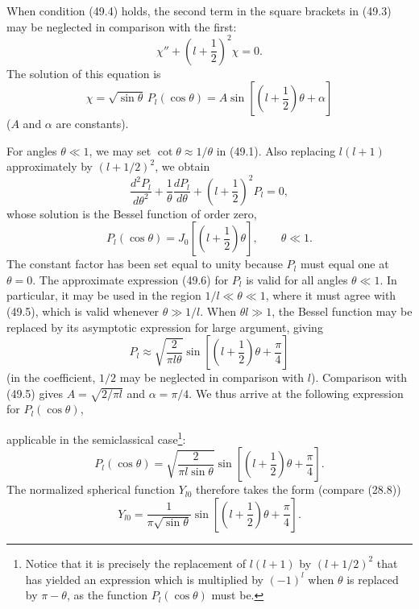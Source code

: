 When condition (49.4) holds, the second term in the square brackets in (49.3)
may be neglected in comparison with the first:
\[
  \chi''+\left(l+\frac12\right)^2\chi=0.
\]
The solution of this equation is
\begin{equation}
  \chi=\sqrt{\sin\theta}\,P_l(\cos\theta)
  =A\sin\left[\left(l+\frac12\right)\theta+\alpha\right]
  \tag{49.5}
\end{equation}
($A$ and $\alpha$ are constants).

For angles $\theta\ll1$, we may set $\cot\theta\approx1/\theta$ in (49.1).
Also replacing $l(l+1)$ approximately by $(l+1/2)^2$, we obtain
\[
  \frac{d^2P_l}{d\theta^2}+\frac1\theta\frac{dP_l}{d\theta}
  +\left(l+\frac12\right)^2P_l=0,
\]
whose solution is the Bessel function of order zero,
\begin{equation}
  P_l(\cos\theta)=J_0\left[\left(l+\frac12\right)\theta\right],
  \qquad\theta\ll1.
  \tag{49.6}
\end{equation}
The constant factor has been set equal to unity because $P_l$ must equal one
at $\theta=0$. The approximate expression (49.6) for $P_l$ is valid for all
angles $\theta\ll1$. In particular, it may be used in the region
$1/l\ll\theta\ll1$, where it must agree with (49.5), which is valid whenever
$\theta\gg1/l$. When $\theta l\gg1$, the Bessel function may be replaced by
its asymptotic expression for large argument, giving
\[
  P_l\approx\sqrt{\frac{2}{\pi l\theta}}
  \sin\left[\left(l+\frac12\right)\theta+\frac\pi4\right]
\]
(in the coefficient, $1/2$ may be neglected in comparison with $l$).
Comparison with (49.5) gives $A=\sqrt{2/\pi l}$ and $\alpha=\pi/4$. We thus
arrive at the following expression for $P_l(\cos\theta)$,

applicable in the semiclassical case\footnote{Notice that it is precisely the
replacement of $l(l+1)$ by $(l+1/2)^2$ that has yielded an expression which
is multiplied by $(-1)^l$ when $\theta$ is replaced by $\pi-\theta$, as the
function $P_l(\cos\theta)$ must be.}:
\begin{equation}
  P_l(\cos\theta)=\sqrt{\frac{2}{\pi l\sin\theta}}
  \sin\left[\left(l+\frac12\right)\theta+\frac\pi4\right].
  \tag{49.7}
\end{equation}
The normalized spherical function $Y_{l0}$ therefore takes the form (compare
(28.8))
\begin{equation}
  Y_{l0}=\frac{1}{\pi\sqrt{\sin\theta}}
  \sin\left[\left(l+\frac12\right)\theta+\frac\pi4\right].
  \tag{49.8}
\end{equation}

